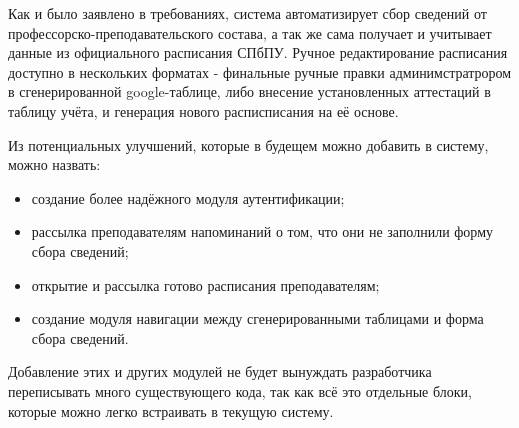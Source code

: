 Как и было заявлено в требованиях, система автоматизирует сбор сведений от профессорско-преподавательского состава, а так же сама получает и учитывает данные из официального расписания СПбПУ. Ручное редактирование расписания доступно в нескольких форматах - финальные ручные правки админимстратрором в сгенерированной google-таблице, либо внесение установленных аттестаций в таблицу учёта, и генерация нового расписписания на её основе.

Из потенциальных улучшений, которые в будещем можно добавить в систему, можно назвать:
\begin{itemize}
	\item создание более надёжного модуля аутентификации;
	\item рассылка преподавателям напоминаний о том, что они не заполнили форму сбора сведений;
	\item открытие и рассылка готово расписания преподавателям;
	\item создание модуля навигации между сгенерированными таблицами и форма сбора сведений.
\end{itemize} 	

Добавление этих и других модулей не будет вынуждать разработчика переписывать много существующего кода, так как всё это отдельные блоки, которые можно легко встраивать в текущую систему.